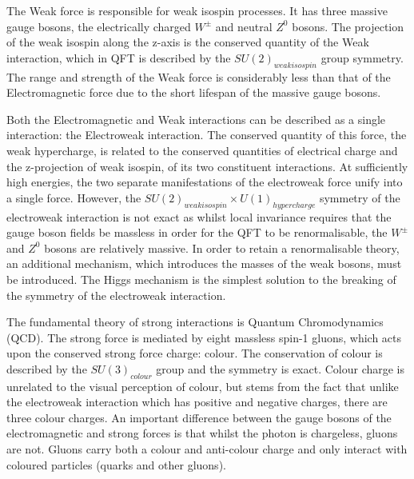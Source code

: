 The Weak force is responsible for weak isospin processes. 
It has three massive gauge bosons, the electrically charged $W^{\pm}$ and neutral $Z^{0}$ bosons. 
The projection of the weak isospin along the z-axis is the conserved quantity of the Weak interaction, which in QFT is described by the $SU(2)_{weak isospin}$ group symmetry. 
The range and strength of the Weak force is considerably less than that of the Electromagnetic force due to the short lifespan of the massive gauge bosons. 

Both the Electromagnetic and Weak interactions can be described as a single interaction: the Electroweak interaction. 
The conserved quantity of this force, the weak hypercharge, is related to the conserved quantities of electrical charge and the z-projection of weak isospin, of its two constituent interactions. 
At sufficiently high energies, the two separate manifestations of the electroweak force unify into a single force. 
However, the $SU(2)_{weak isospin} \times U(1)_{hypercharge}$ symmetry of the electroweak interaction is not exact as whilst local invariance requires that the gauge boson fields be massless in order for the QFT to be renormalisable, the $W^{\pm}$ and $Z^{0}$ bosons are relatively massive. 
In order to retain a renormalisable theory, an additional mechanism, which introduces the masses of the weak bosons, must be introduced. 
The Higgs mechanism is the simplest solution to the breaking of the symmetry of the electroweak interaction. 

The fundamental theory of strong interactions is Quantum Chromodynamics (QCD). 
The strong force is mediated by eight massless spin-1 gluons, which acts upon the conserved strong force charge: colour. 
The conservation of colour is described by the $SU(3)_{colour}$ group and the symmetry is exact. 
Colour charge is unrelated to the visual perception of colour, but stems from the fact that unlike the electroweak interaction which has positive and negative charges, there are three colour charges. 
An important difference between the gauge bosons of the electromagnetic and strong forces is that whilst the photon is chargeless, gluons are not. 
Gluons carry both a colour and anti-colour charge and only interact with coloured particles (quarks and other gluons). 

